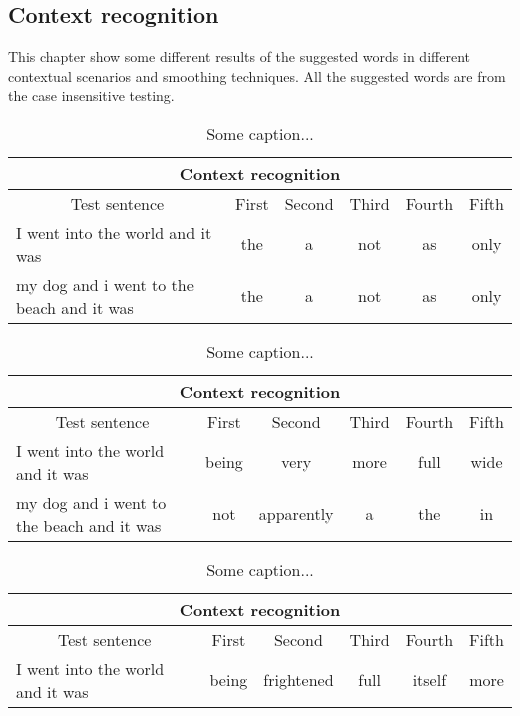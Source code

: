 {\subsection{Context recognition}
This chapter show some different results of the suggested words in different contextual scenarios and smoothing techniques. All the suggested words are from the case insensitive testing.

\vspace{-1cm}
\begin{table}[H]
\centering
\caption{Some caption...}
\begin{tabular}{ |p{}|c|c|c|c|c| }
	\hline
	\multicolumn{6}{|c|}{Context recognition} \\
	\hline
	\multicolumn{1}{|c|}{Test sentence} & First & Second & Third & Fourth & Fifth\\
	\hline
	I went into the world and it was & the & a & not & as & only \\
	\hline
	my dog and i went to the beach and it was & the & a & not & as & only \\
	\hline
\end{tabular}
\end{table}

\vspace{-1cm}
\begin{table}[H]
\centering
\caption{Some caption...}
\begin{tabular}{ |p{}|c|c|c|c|c| }
	\hline
	\multicolumn{6}{|c|}{Context recognition} \\
	\hline
	\multicolumn{1}{|c|}{Test sentence} & First & Second & Third & Fourth & Fifth\\
	\hline
	I went into the world and it was & being & very & more & full & wide \\
	\hline
	my dog and i went to the beach and it was & not & apparently & a & the & in \\
	\hline
\end{tabular}
\end{table}

\vspace{-1cm}
\begin{table}[H]
\centering
\caption{Some caption...}
\begin{tabular}{ |p{}|c|c|c|c|c| }
	\hline
	\multicolumn{6}{|c|}{Context recognition} \\
	\hline
	\multicolumn{1}{|c|}{Test sentence} & First & Second & Third & Fourth & Fifth\\
	\hline
	I went into the world and it was & being & frightened & full & itself & more \\
	\hline
\end{tabular}
\end{table}
}